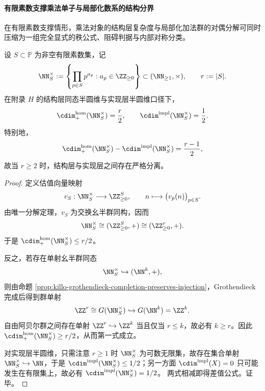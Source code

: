 \paragraph{有限素数支撑乘法单子与局部化数系的结构分界}
在有限素数支撑情形，乘法对象的结构层复杂度与局部化加法群的对偶分解可同时压缩为一组完全显式的秩公式、阻碍判据与内部对称分类。

\begin{theorem}[有限素数支撑乘法单子的结构层同态半圆维公式]\label{thm:xi-finite-prime-support-multiplicative-half-circle-dimension}
设 \(S\subset\mathbb P\) 为非空有限素数集，记
\[
\NN_S^\times:=\left\{\prod_{p\in S}p^{a_p}: a_p\in \ZZ_{\ge 0}\right\}\subset (\NN_{\ge 1},\times),
\qquad
r:=|S|.
\]
在附录 \(H\) 的结构层同态半圆维与实现层半圆维口径下，
\[
\cdim^{\mathrm{hom}}_{+}(\NN_S^\times)=\frac{r}{2},
\qquad
\cdim^{\mathrm{impl}}(\NN_S^\times)=\frac12.
\]
特别地，
\[
\cdim^{\mathrm{hom}}_{+}(\NN_S^\times)-\cdim^{\mathrm{impl}}(\NN_S^\times)
=\frac{r-1}{2},
\]
故当 \(r\ge 2\) 时，结构层与实现层之间存在严格分离。
\end{theorem}
\begin{proof}
定义估值向量映射
\[
v_S:\NN_S^\times\longrightarrow \ZZ_{\ge 0}^{S},
\qquad
n\longmapsto \bigl(v_p(n)\bigr)_{p\in S}.
\]
由唯一分解定理，\(v_S\) 为交换幺半群同构，因而
\[
\NN_S^\times\cong (\ZZ_{\ge 0}^{S},+)\cong (\ZZ_{\ge 0}^{r},+).
\]
于是
\(
\cdim^{\mathrm{hom}}_{+}(\NN_S^\times)\le r/2
\)。

反之，若存在单射幺半群同态
\[
\NN_S^\times\hookrightarrow (\NN^k,+),
\]
则由命题 \ref{prop:killo-grothendieck-completion-preserves-injection}，Grothendieck 完成后得到群单射
\[
\ZZ^r\cong G(\NN_S^\times)\hookrightarrow G(\NN^k)=\ZZ^k.
\]
自由阿贝尔群之间存在单射 \(\ZZ^r\hookrightarrow \ZZ^k\) 当且仅当 \(r\le k\)，故必有 \(k\ge r\)。因此
\(
\cdim^{\mathrm{hom}}_{+}(\NN_S^\times)\ge r/2
\)，从而第一式成立。

对实现层半圆维，只需注意 \(r\ge 1\) 时 \(\NN_S^\times\) 为可数无限集，故存在集合单射
\(
\NN_S^\times\hookrightarrow \NN
\)，于是
\(
\cdim^{\mathrm{impl}}(\NN_S^\times)\le 1/2
\)；另一方面 \(\cdim^{\mathrm{impl}}(X)=0\) 只可能发生在有限集上，故必有
\(
\cdim^{\mathrm{impl}}(\NN_S^\times)=1/2
\)。
两式相减即得差值公式。证毕。
\end{proof}

